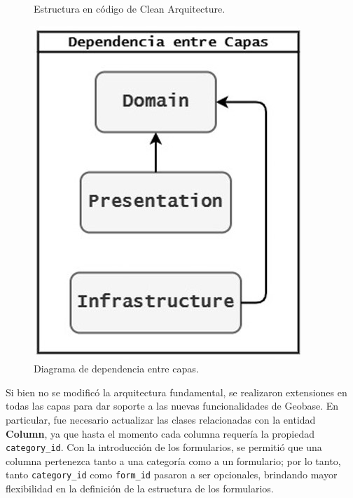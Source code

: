 \documentclass[12pt, a4paper]{book}
\begin{document}
\begin{figure}[H]
\begin{minipage}[b]{0.4\textwidth}
    \caption{Estructura en código de Clean Arquitecture.}
    \label{fig:cleanarquitecturecode}
  \end{minipage}
  \hspace{0.02\textwidth}
  \begin{minipage}[b]{0.4\textwidth}
    \centering
    \includegraphics[width=\textwidth]{images/clean_arq_dependences.jpg}
    \caption{Diagrama de dependencia entre capas.}
    \label{fig:cleanarquitecturedependences}
  \end{minipage}
  \label{fig:mer_comparacion}
\end{figure}

Si bien no se modificó la arquitectura fundamental, se realizaron extensiones en todas las capas para dar soporte a las nuevas funcionalidades de Geobase. En particular, fue necesario actualizar las clases relacionadas con la entidad \textbf{Column}, ya que hasta el momento cada columna requería la propiedad \texttt{category\_id}. Con la introducción de los formularios, se permitió que una columna pertenezca tanto a una categoría como a un formulario; por lo tanto, tanto \texttt{category\_id} como \texttt{form\_id} pasaron a ser opcionales, brindando mayor flexibilidad en la definición de la estructura de los formularios.
\end{document}
